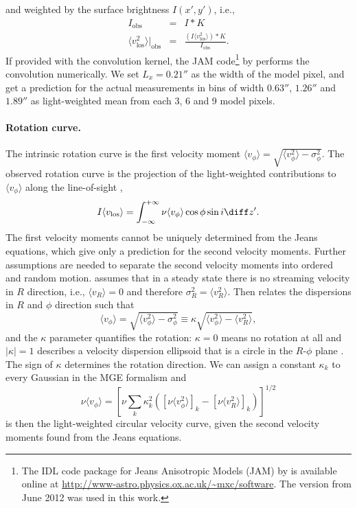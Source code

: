 and weighted by the surface brightness $I(x',y')$, i.e.,
\begin{eqnarray*}
I_\text{obs} &=& I \ast K\\
\langle v_\text{los}^2 \rangle |_\text{obs} &=& \frac{(I \langle v_\text{los}^2\rangle) \ast K}{I_\text{obs}}.
\end{eqnarray*}
If provided with the convolution kernel, the JAM code\footnote{The IDL code package for Jeans Anisotropic Models (JAM) by \citet{Cap08} is available online at \url{http://www-astro.physics.ox.ac.uk/~mxc/software}. The version from June 2012 was used in this work.} by \citet{Cap08} performs the convolution numerically. We set $L_x = 0.21''$ as the width of the model pixel, and get a prediction for the actual measurements in bins of width $0.63''$, $1.26''$ and $1.89''$ \citep{SWELLSV} as light-weighted mean from each 3, 6 and 9 model pixels.

\paragraph{Rotation curve.} The intrinsic rotation curve is the first velocity moment $\langle v_\phi\rangle = \sqrt{\langle v_\phi^2 \rangle - \sigma_\phi^2}$. The observed rotation curve is the projection of the light-weighted contributions to $\langle v_\phi\rangle$ along the line-of-sight \citep{Cap08},
\begin{equation*}
I \langle v_\text{los}\rangle = \int_{-\infty}^{+\infty} \nu \langle v_\phi\rangle \cos \phi \sin i \diff z'.
\end{equation*}
The first velocity moments cannot be uniquely determined from the Jeans equations, which give only a prediction for the second velocity moments. Further assumptions are needed to separate the second velocity moments into ordered and random motion. \citet{Cap08} assumes that in a steady state there is no streaming velocity in $R$ direction, i.e., $\langle v_R \rangle = 0$ and therefore $\sigma_R^2 = \langle v_R^2 \rangle$. Then \citet{Cap08} relates the dispersions in $R$ and $\phi$ direction such that
$$\langle v_\phi\rangle = \sqrt{\langle v_\phi^2 \rangle - \sigma_\phi^2} \equiv \kappa \sqrt{\langle v_\phi^2 \rangle - \langle v_R^2 \rangle},$$
and the $\kappa$ parameter quantifies the rotation: $\kappa = 0$ means no rotation at all and $|\kappa| = 1$ describes a velocity dispersion ellipsoid that is a circle in the $R$-$\phi$ plane \citep{Cap08}. The sign of $\kappa$ determines the rotation direction. We can assign a constant $\kappa_k$ to every Gaussian in the MGE formalism and
\begin{equation*}
\nu \langle v_\phi\rangle = \left[\nu \sum_{k} \kappa_k^2 \left( [\nu\langle v_\phi^2 \rangle]_k - [\nu\langle v_R^2 \rangle]_k\right) \right]^{1/2}
\end{equation*} 
is then the light-weighted circular velocity curve, given the second velocity moments found from the Jeans equations.

